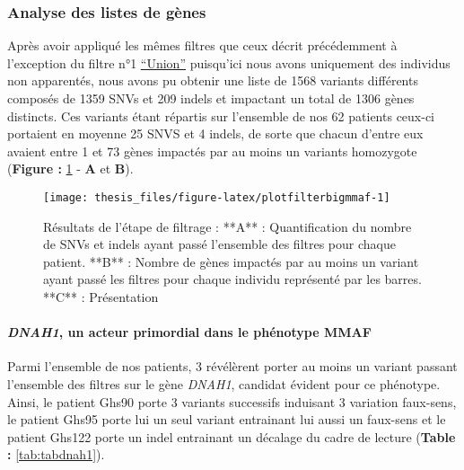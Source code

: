 \documentclass[12pt,twoside]{reedthesis}
\theoremstyle{definition}
\theoremstyle{definition}
\theoremstyle{remark}
\begin{document}
  \newpage
  
  \subsubsection{Analyse des listes de
  gènes}\label{analyse-des-listes-de-genes}
  
  Après avoir appliqué les mêmes filtres que ceux décrit précédemment à
  l'exception du filtre n°1
  \protect\hyperlink{filterdescription}{``Union''} puisqu'ici nous avons
  uniquement des individus non apparentés, nous avons pu obtenir une liste
  de 1568 variants différents composés de 1359 SNVs et 209 indels et
  impactant un total de 1306 gènes distincts. Ces variants étant répartis
  sur l'ensemble de nos 62 patients ceux-ci portaient en moyenne 25 SNVS
  et 4 indels, de sorte que chacun d'entre eux avaient entre 1 et 73 gènes
  impactés par au moins un variants homozygote (\textbf{Figure :
  }\ref{fig:plotfilterbigmmaf} - \textbf{A} et \textbf{B}).
  
  \begin{figure}
  
  {\centering \texttt{[image: thesis\_files/figure-latex/plotfilterbigmmaf-1]} 
  
  }
  
  \caption[Résultats de l'étape de filtrage]{Résultats de l'étape de filtrage : **A** : Quantification du nombre de SNVs et indels ayant passé l'ensemble des filtres pour chaque patient. **B** : Nombre de gènes impactés par au moins un variant ayant passé les filtres pour chaque individu représenté par les barres. **C** : Présentation }\label{fig:plotfilterbigmmaf}
  \end{figure}
  
  \newpage
  
  \paragraph{\texorpdfstring{\emph{DNAH1}, un acteur primordial dans le
  phénotype
  MMAF}{DNAH1, un acteur primordial dans le phénotype MMAF}}\label{dnah1-un-acteur-primordial-dans-le-phenotype-mmaf}
  
  Parmi l'ensemble de nos patients, 3 révélèrent porter au moins un
  variant passant l'ensemble des filtres sur le gène \emph{DNAH1},
  candidat évident pour ce phénotype. Ainsi, le patient Ghs90 porte 3
  variants successifs induisant 3 variation faux-sens, le patient Ghs95
  porte lui un seul variant entrainant lui aussi un faux-sens et le
  patient Ghs122 porte un indel entrainant un décalage du cadre de lecture
  (\textbf{Table : }\ref{tab:tabdnah1}).
  
\end{document}

